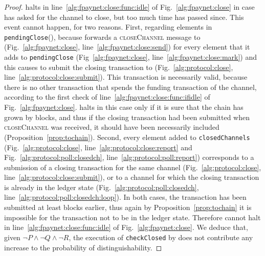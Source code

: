 \begin{proof}
  \fpaynet{} halts in line~\ref{alg:fpaynet:close:func:idle} of
  Fig.~\ref{alg:fpaynet:close} in case \environment{} has asked for the channel
  to close, but too much time has passed since. This event cannot happen, for
  two reasons. First, regarding elements in \texttt{pendingClose}(\alice),
  because \fpaynet{} forwards a \textsc{closeChannel} message to \simulator{}
  (Fig.~\ref{alg:fpaynet:close}, line~\ref{alg:fpaynet:close:send}) for every
  element that it adds to \texttt{pendingClose} (Fig~\ref{alg:fpaynet:close},
  line~\ref{alg:fpaynet:close:mark}) and this causes \simulator{} to submit the
  closing transaction to \ledger{} (Fig.~\ref{alg:protocol:close},
  line~\ref{alg:protocol:close:submit}). This transaction is necessarily valid,
  because there is no other transaction that spends the funding transaction of
  the channel, according to the first check of
  line~\ref{alg:fpaynet:close:func:ifidle} of Fig.~\ref{alg:fpaynet:close}.
  \fpaynet{} halts in this case only if it is sure that the chain has grown by
  \tochain{} blocks, and thus if the closing transaction had been submitted when
  \textsc{closeChannel} was received, it should have been necessarily included
  (Proposition~\ref{prop:tochain}). Second, every element added to
  \texttt{closedChannels} (Fig.~\ref{alg:protocol:close},
  line~\ref{alg:protocol:close:report} and
  Fig.~\ref{alg:protocol:poll:closedch}, line~\ref{alg:protocol:poll:report})
  corresponds to a submission of a closing transaction for the same channel
  (Fig.~\ref{alg:protocol:close}, line~\ref{alg:protocol:close:submit}), or to a
  channel for which the closing transaction is already in the ledger state
  (Fig.~\ref{alg:protocol:poll:closedch},
  line~\ref{alg:protocol:poll:closedch:loop}). In both cases, the transaction
  has been submitted at least \tochain{} blocks earlier, thus again by
  Proposition~\ref{prop:tochain} it is impossible for the transaction not to be
  in the ledger state. Therefore \fpaynet{} cannot halt in
  line~\ref{alg:fpaynet:close:func:idle} of Fig.~\ref{alg:fpaynet:close}. We
  deduce that, given $\neg P \wedge \neg Q \wedge \neg R$, the execution of
  \texttt{checkClosed} by \fpaynet{} does not contribute any increase to the
  probability of distinguishability.
\end{proof}
